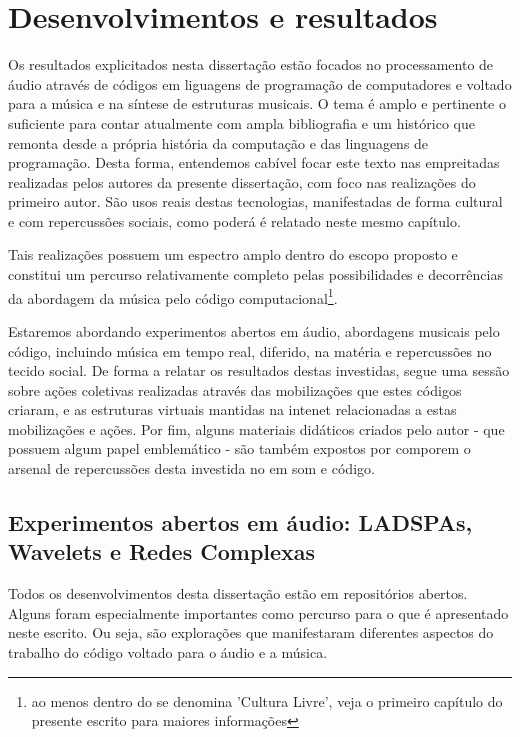 \chapter{Desenvolvimentos e resultados} %
\label{cap:resultados} %
Os resultados explicitados nesta dissertação estão focados no processamento de 
áudio através de códigos em liguagens de programação de computadores e
voltado para a música e na síntese de estruturas musicais. O tema é amplo
e pertinente o suficiente para contar atualmente com ampla bibliografia e um histórico
que remonta desde a própria história da computação e das linguagens de programação.
Desta forma, entendemos cabível focar este texto nas empreitadas realizadas pelos autores
da presente dissertação, com foco nas realizações do primeiro autor. São usos
reais destas tecnologias, manifestadas de forma cultural e com repercussões
sociais, como poderá é relatado neste mesmo capítulo.

Tais realizações possuem um espectro amplo
dentro do escopo proposto e constitui um percurso relativamente completo
pelas possibilidades e decorrências da abordagem da música pelo código computacional\footnote{ao menos dentro do se denomina 'Cultura Livre', veja o primeiro capítulo do presente escrito para maiores informações}.

Estaremos abordando experimentos abertos em áudio, abordagens musicais pelo código, incluindo música em tempo real, diferido, na matéria e repercussões no tecido social. De forma a relatar os resultados destas investidas, segue uma sessão sobre ações coletivas realizadas através das mobilizações que estes códigos criaram, e as estruturas virtuais mantidas na intenet relacionadas a estas mobilizações e ações. Por fim, alguns materiais didáticos criados pelo autor - que possuem algum papel emblemático - são também expostos por comporem o arsenal de repercussões desta investida no em som e código. 

  \section{Experimentos abertos em áudio: LADSPAs, Wavelets e Redes Complexas}

Todos os desenvolvimentos desta dissertação estão em repositórios abertos\cite{repositorios-tese-dev}.
Alguns foram especialmente importantes como percurso para o que é apresentado neste
escrito. Ou seja, são explorações que manifestaram diferentes aspectos
do trabalho do código voltado para o áudio e a música.

